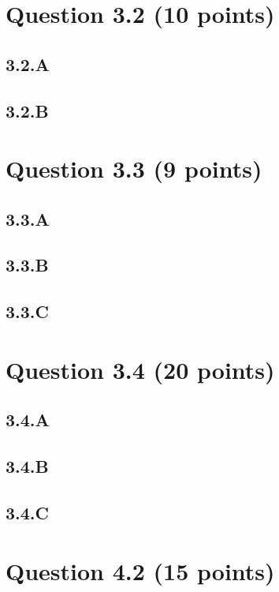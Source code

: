 \documentclass{article}
\begin{document}
\section*{Question 3.2 (10 points)}

\subsection*{3.2.A}

\subsection*{3.2.B}


\section*{Question 3.3 (9 points)}

\subsection*{3.3.A}

\subsection*{3.3.B}

\subsection*{3.3.C}


\section*{Question 3.4 (20 points)}

\subsection*{3.4.A}

\subsection*{3.4.B}

\subsection*{3.4.C}


\section*{Question 4.2 (15 points)}
\end{document}
